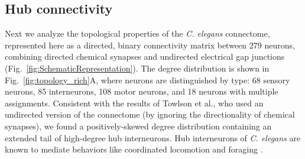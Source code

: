 \documentclass[10pt,letterpaper]{article}
\begin{document}


\subsection*{Hub connectivity}


Next we analyze the topological properties of the \emph{C. elegans} connectome, represented here as a directed, binary connectivity matrix between 279 neurons, combining directed chemical synapses and undirected electrical gap junctions (Fig.~\ref{fig:SchematicRepresentation}).
The degree distribution is shown in Fig.~\ref{fig:topology_rich}A, where neurons are distinguished by type: 68 sensory neurons, 85 interneurons, 108 motor neurons, and 18 neurons with multiple assignments.
Consistent with the results of Towlson et al., who used an undirected version of the connectome (by ignoring the directionality of chemical synapses), we found a positively-skewed degree distribution containing an extended tail of high-degree hub interneurons.
Hub interneurons of \emph{C. elegans} are known to mediate behaviors like coordinated locomotion and foraging \cite{tsalik2003}.
\end{document}
